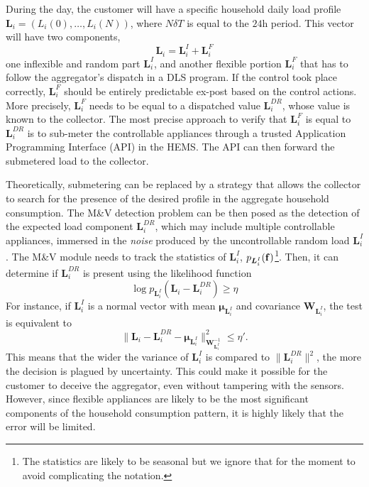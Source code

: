 \documentclass[10pt]{IEEEtran}
\begin{document}
During the day, the customer will have a specific household daily load profile $\boldsymbol{L}_i=(L_i(0),\ldots,L_i(N))$, where $N\delta T$ is equal to 
the $24$h period. This vector will have two components, 
\begin{equation}
\boldsymbol{L}_i=\boldsymbol{L}^I_i+\boldsymbol{L}^F_i 
\end{equation} 
one inflexible and random part $\boldsymbol{L}^I_i$, and another flexible portion $\boldsymbol{L}_i^F$ that has to follow the aggregator's dispatch in a DLS program. If the control took place correctly, $\boldsymbol{L}_i^F$ should be entirely predictable ex-post based on the control actions. More precisely, $\boldsymbol{L}_i^F$ needs to be equal to a dispatched value $\boldsymbol{L}_i^{DR}$, whose value is known to the collector.
The most precise approach to verify that $\boldsymbol{L}_i^F$ is equal to $\boldsymbol{L}_i^{DR}$ is to sub-meter the controllable appliances through a  trusted Application Programming Interface (API) in the HEMS. The API can then forward the submetered load to the collector.

Theoretically, submetering can be replaced by a strategy that allows the collector to search for the presence of the desired profile in the aggregate household consumption.  The M\&V detection problem can be then posed as the detection of the expected load component $\boldsymbol{L}_i^{DR}$, which may include multiple controllable appliances, immersed in the {\it noise} produced by the uncontrollable random load $\boldsymbol{L}^I_i$.
The M\&V module needs to track the statistics of $\boldsymbol{L}^I_i$, $p_{\boldsymbol{L}^I_i}({\bf f})$\footnote{The statistics are likely to be seasonal but we ignore that for the moment to avoid complicating the notation.}. Then, it can determine if $\boldsymbol{L}_i^{DR}$ is present using the likelihood function
\begin{equation}
\log p_{\boldsymbol{L}^I_i}(\boldsymbol{L}_i-\boldsymbol{L}_i^{DR} )\geq \eta
\end{equation}
For instance, if $\boldsymbol{L}^I_i$ is a normal vector with mean $\boldsymbol{\mu}_{\boldsymbol{L}^I_i}$ and covariance 
$\boldsymbol{W}_{\boldsymbol{L}^I_i}$, the test is equivalent to 
$$\|\boldsymbol{L}_i-\boldsymbol{L}_i^{DR}-\boldsymbol{\mu}_{\boldsymbol{L}^I_i}\|^2_{\boldsymbol{W}_{\boldsymbol{L}^I_i}^{-1}}\leq \eta'.$$
This means that the wider the variance of $\boldsymbol{L}^I_i$ is compared to $\|\boldsymbol{L}_i^{DR}\|^2$, the more the decision is plagued by uncertainty. This could make it possible for the customer to deceive the aggregator, even without tampering with the sensors. However, since flexible appliances are likely to be the most significant components of the household consumption pattern, it is highly likely that the error will be limited.   
\end{document}
